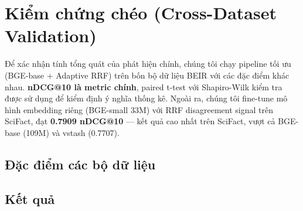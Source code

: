 \section{Kiểm chứng chéo (Cross-Dataset Validation)}
\label{sec:validation}

Để xác nhận tính tổng quát của phát hiện chính, chúng tôi chạy pipeline tối ưu (BGE-base + Adaptive
RRF) trên bốn bộ dữ liệu BEIR với các đặc điểm khác nhau. \textbf{nDCG@10 là metric chính}, paired
t-test với Shapiro-Wilk kiểm tra được sử dụng để kiểm định ý nghĩa thống kê. Ngoài ra, chúng tôi
fine-tune mô hình embedding riêng (BGE-small 33M) với RRF disagreement signal trên SciFact, đạt
\textbf{0.7909 nDCG@10} --- kết quả cao nhất trên SciFact, vượt cả BGE-base (109M) và vstash (0.7707).

\subsection{Đặc điểm các bộ dữ liệu}
\label{sec:validation:datasets}

\begin{table}[htbp]
\centering
\caption{Đặc điểm bốn bộ dữ liệu BEIR dùng trong kiểm chứng.}
\label{tab:dataset-characteristics}
\end{table}

\subsection{Kết quả}
\label{sec:validation:results}

